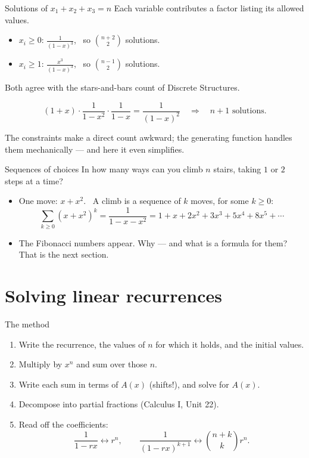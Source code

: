 \documentclass[10pt]{wosm-slides}
\begin{document}
\begin{frame}{Solutions of $x_1 + x_2 + x_3 = n$}
  Each variable contributes a factor listing its allowed values.
  \begin{itemize}
    \item $x_i \ge 0$: \quad $\frac{1}{(1-x)^3}$, \ so $\binom{n+2}{2}$ solutions.
    \item $x_i \ge 1$: \quad $\frac{x^3}{(1-x)^3}$, \ so $\binom{n-1}{2}$ solutions.
  \end{itemize}
  Both agree with the stars-and-bars count of Discrete Structures.
  \pause
  \begin{example}[$x_1 \in \{0, 1\}$, \ $x_2$ even, \ $x_3 \ge 0$]
    \[ (1 + x) \cdot \frac{1}{1 - x^2} \cdot \frac{1}{1 - x} = \frac{1}{(1-x)^2}
       \quad\Longrightarrow\quad n + 1 \text{ solutions.} \]
  \end{example}
  {\small The constraints make a direct count awkward; the generating function handles them
  mechanically --- and here it even simplifies.\par}
\end{frame}

\begin{frame}{Sequences of choices}
  In how many ways can you climb $n$ stairs, taking $1$ or $2$ steps at a time?
  \pause
  \begin{itemize}
    \item One move: $x + x^2$. \ A climb is a sequence of $k$ moves, for some $k \ge 0$:
      \[ \sum_{k \ge 0} (x + x^2)^k = \frac{1}{1 - x - x^2} = 1 + x + 2x^2 + 3x^3 + 5x^4 + 8x^5 + \cdots \]
    \item The Fibonacci numbers appear. Why --- and what is a formula for them?
      That is the next section.
  \end{itemize}
\end{frame}

\section{Solving linear recurrences}

\begin{frame}{The method}
  \begin{enumerate}
    \item Write the recurrence, the values of $n$ for which it holds, and the initial values.
    \item Multiply by $x^n$ and sum over those $n$.
    \item Write each sum in terms of $A(x)$ (shifts!), and solve for $A(x)$.
    \item Decompose into partial fractions (Calculus I, Unit 22).
    \item Read off the coefficients:
      \[ \frac{1}{1 - rx} \leftrightarrow r^n, \qquad
         \frac{1}{(1 - rx)^{k+1}} \leftrightarrow \binom{n + k}{k} r^n . \]
  \end{enumerate}
\end{frame}
\end{document}
